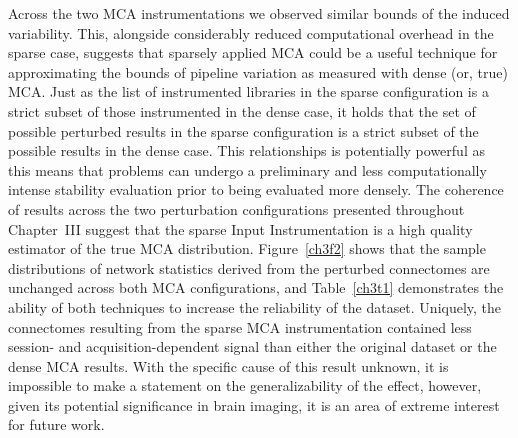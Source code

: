 Across the two MCA instrumentations we observed similar bounds of the induced variability. This, alongside
considerably reduced computational overhead in the sparse case, suggests that sparsely applied MCA could be a
useful technique for approximating the bounds of pipeline variation as measured with dense (or, true) MCA. Just as
the list of instrumented libraries in the sparse configuration is a strict subset of those instrumented in the
dense case, it holds that the set of possible perturbed results in the sparse configuration is a strict subset of
the possible results in the dense case. This relationships is potentially powerful as this means that problems can
undergo a preliminary and less computationally intense stability evaluation prior to being evaluated more densely.
The coherence of results across the two perturbation configurations presented throughout Chapter~III suggest that
the sparse Input Instrumentation is a high quality estimator of the true MCA distribution. Figure~\ref{ch3f2}
shows that the sample distributions of network statistics derived from the perturbed connectomes are unchanged
across both MCA configurations, and Table~\ref{ch3t1} demonstrates the ability of both techniques to increase the
reliability of the dataset. Uniquely, the connectomes resulting from the sparse MCA instrumentation contained less
session- and acquisition-dependent signal than either the original dataset or the dense MCA results. With the
specific cause of this result unknown, it is impossible to make a statement on the generalizability of the effect,
however, given its potential significance in brain imaging, it is an area of extreme interest for future work.

